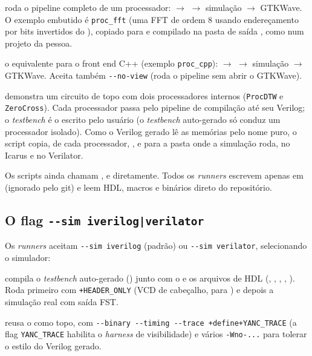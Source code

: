 \begin{description}[leftmargin=1.2em]
  \item[\file{single\_proc.sh}] roda o pipeline \cmm{} completo de um processador:
     $\rightarrow$  $\rightarrow$ simulação
    $\rightarrow$ GTKWave. O exemplo embutido é \lstinline|proc_fft| (uma FFT de
    ordem 8 usando endereçamento por bits invertidos do \cmm{}), copiado para
     e compilado na pasta de saída
    , como num projeto da pessoa.
  \item[\file{single\_proc\_cpp.sh}] o equivalente para o front end C++
    (exemplo \lstinline|proc_cpp|):  $\rightarrow$ 
    $\rightarrow$ simulação $\rightarrow$ GTKWave. Aceita também
    \lstinline|--no-view| (roda o pipeline sem abrir o GTKWave).
  \item[\file{multi\_proc.sh}] demonstra um circuito de topo com dois
    processadores  internos (\lstinline|ProcDTW| e
    \lstinline|ZeroCross|). Cada processador passa pelo pipeline de compilação até
    seu Verilog; o \emph{testbench} é o  escrito pelo
    usuário (o \emph{testbench} auto-gerado só conduz um processador isolado).
    Como o Verilog gerado lê as memórias pelo nome puro, o script copia, de cada
    processador, ,  e
     para a pasta onde a simulação roda, no Icarus e no
    Verilator.
\end{description}

Os scripts ainda chamam ,  e 
diretamente. Todos os \emph{runners} escrevem apenas em  (ignorado
pelo git) e leem HDL, macros e binários direto do repositório.

\subsection{O flag \texttt{-{}-sim iverilog|verilator}}
\label{sec:yanc-simflag}

Os \emph{runners} aceitam \lstinline|--sim iverilog| (padrão) ou
\lstinline|--sim verilator|, selecionando o simulador:

\begin{description}[leftmargin=1.2em]
  \item[Icarus (\tool{iverilog} + \tool{vvp})] compila o \emph{testbench}
    auto-gerado () junto com o  e os arquivos de
    HDL (, , , ,
    ). Roda primeiro com \lstinline|+HEADER_ONLY| (VCD de cabeçalho,
    para ) e depois a simulação real com saída FST.
  \item[Verilator] reusa o  como topo, com
    \lstinline|--binary --timing --trace +define+YANC_TRACE| (a flag
    \lstinline|YANC_TRACE| habilita o \emph{harness} de visibilidade) e vários
    \lstinline|-Wno-...| para tolerar o estilo do Verilog gerado.
\end{description}

